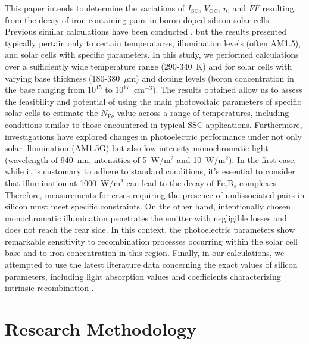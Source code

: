 \documentclass[a4paper,fleqn]{cas-sc}
\begin{document}
This paper intends to determine the variations of $I_\mathrm{SC}$, $V_\mathrm{OC}$, $\eta$, and $F\!F$
resulting from the decay of iron-containing pairs in boron-doped silicon solar cells.
Previous similar calculations have been conducted \cite{FeB:Schmidt,IronSC,Hajjiah2020},
but the results presented typically pertain only to certain temperatures,
illumination levels (often AM1.5), and solar cells with specific parameters.
In this study, we performed calculations over a sufficiently wide temperature range (290-340~K)
and for solar cells with varying base thickness (180-380~$\mu$m) and doping levels
(boron concentration in the base ranging from $10^{15}$ to $10^{17}$~cm$^{-3}$).
The results obtained allow us to assess the feasibility and potential of using the
main photovoltaic parameters of specific solar cells to estimate the $N_\mathrm{Fe}$ value across a range of temperatures,
including conditions similar to those encountered in typical SSC applications.
Furthermore, investigations have explored changes in photoelectric performance under not only solar illumination (AM1.5G)
but also low-intensity monochromatic light (wavelength of 940~nm, intensities of 5~W/m$^{2}$ and 10~W/m$^{2}$).
In the first case, while it is customary to adhere to standard conditions,
it's essential to consider that illumination at 1000~W/m$^{2}$ can lead to the decay of Fe$_i$B$_s$ complexes \cite{Macdonald2004}.
Therefore, measurements for cases requiring the presence of undissociated pairs in silicon must meet specific constraints.
On the other hand, intentionally chosen monochromatic illumination penetrates the emitter with negligible losses and does not reach the rear side.
In this context, the photoelectric parameters show remarkable sensitivity
to recombination processes occurring within the solar cell base and to iron concentration in this region.
Finally, in our calculations, we attempted to use the latest literature data
concerning the exact values of silicon parameters, including light absorption values \cite{Green2022}
and coefficients characterizing intrinsic recombination \cite{Brad2022,AugerSi2022}.

\section{Research Methodology}%
\end{document}

